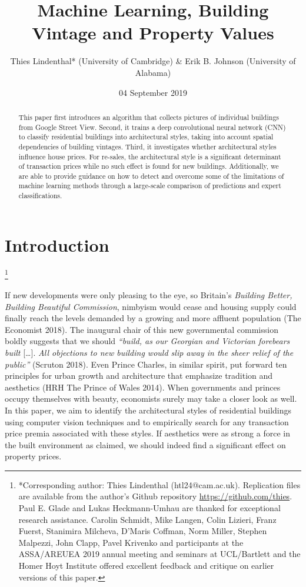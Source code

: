 \documentclass[]{article}
\title{Machine Learning, Building Vintage and Property Values}
\author{Thies Lindenthal* (University of Cambridge) \& Erik B. Johnson
(University of Alabama)}
\date{04 September 2019}
\let\rmarkdownfootnote\footnote%
\def\footnote{\protect\rmarkdownfootnote}
\begin{document}
\maketitle
\begin{abstract}
This paper first introduces an algorithm that collects pictures of
individual buildings from Google Street View. Second, it trains a deep
convolutional neural network (CNN) to classify residential buildings
into architectural styles, taking into account spatial dependencies of
building vintages. Third, it investigates whether architectural styles
influence house prices. For re-sales, the architectural style is a
significant determinant of transaction prices while no such effect is
found for new buildings. Additionally, we are able to provide guidance
on how to detect and overcome some of the limitations of machine
learning methods through a large-scale comparison of predictions and
expert classifications.
\end{abstract}

\hypertarget{introduction}{%
\section{Introduction}\label{introduction}}

\let\svthefootnote\thefootnote
\let\thefootnote\relax

\footnote{{*Corresponding author: Thies Lindenthal (htl24@cam.ac.uk). Replication files are available from the author's Github repository \href{https://github.com/thies}{https://github.com/thies}. Paul E. Glade and Lukas Heckmann-Umhau are thanked for exceptional research assistance. Carolin Schmidt, Mike Langen, Colin Lizieri, Franz Fuerst, Stanimira Milcheva, D'Maris Coffman, Norm Miller, Stephen Malpezzi, John Clapp, Pavel Krivenko and participants at the ASSA/AREUEA 2019 annual meeting and seminars at UCL/Bartlett and the Homer Hoyt Institute offered excellent feedback and critique on earlier versions of this paper.}}

\addtocounter{footnote}{-1}\let\thefootnote\svthefootnote

If new developments were only pleasing to the eye, so Britain's
\emph{Building Better, Building Beautiful Commission}, nimbyism would
cease and housing supply could finally reach the levels demanded by a
growing and more affluent population (The Economist 2018). The inaugural
chair of this new governmental commission boldly suggests that we should
\emph{``build, as our Georgian and Victorian forebears built}
{[}\ldots{}{]}. \emph{All objections to new building would slip away in
the sheer relief of the public''} (Scruton 2018). Even Prince Charles,
in similar spirit, put forward ten principles for urban growth and
architecture that emphasize tradition and aesthetics (HRH The Prince of
Wales 2014). When governments and princes occupy themselves with beauty,
economists surely may take a closer look as well. In this paper, we aim
to identify the architectural styles of residential buildings using
computer vision techniques and to empirically search for any transaction
price premia associated with these styles. If aesthetics were as strong
a force in the built environment as claimed, we should indeed find a
significant effect on property prices.
\end{document}
